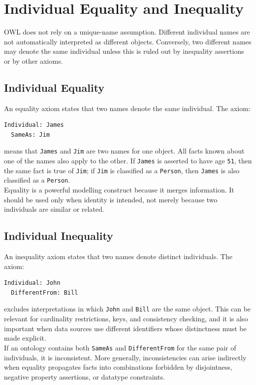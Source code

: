 \documentclass{scrbook}
\begin{document}
	\section{Individual Equality and Inequality}
	
	OWL does not rely on a unique-name assumption. Different individual names are not automatically interpreted as different objects. Conversely, two different names may denote the same individual unless this is ruled out by inequality assertions or by other axioms.
	
	\subsection{Individual Equality}
	
	An equality axiom states that two names denote the same individual. The axiom:
	\begin{lstlisting}
Individual: James
  SameAs: Jim
	\end{lstlisting}
	means that \texttt{James} and \texttt{Jim} are two names for one object. All facts known about one of the names also apply to the other. If \texttt{James} is asserted to have age \texttt{51}, then the same fact is true of \texttt{Jim}; if \texttt{Jim} is classified as a \texttt{Person}, then \texttt{James} is also classified as a \texttt{Person}.\\
	
	Equality is a powerful modelling construct because it merges information. It should be used only when identity is intended, not merely because two individuals are similar or related.
	
	\subsection{Individual Inequality}
	
	An inequality axiom states that two names denote distinct individuals. The axiom:
	\begin{lstlisting}
Individual: John
  DifferentFrom: Bill
	\end{lstlisting}
	excludes interpretations in which \texttt{John} and \texttt{Bill} are the same object. This can be relevant for cardinality restrictions, keys, and consistency checking, and it is also important when data sources use different identifiers whose distinctness must be made explicit.\\
	
	If an ontology contains both \texttt{SameAs} and \texttt{DifferentFrom} for the same pair of individuals, it is inconsistent. More generally, inconsistencies can arise indirectly when equality propagates facts into combinations forbidden by disjointness, negative property assertions, or datatype constraints.
	
\end{document}
